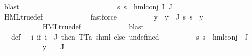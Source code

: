 \begin{isabellebody}
\ blast\isanewline
\ \ \ \ \ \ \isamarkupfalse%
\isanewline
\ \ \ \ \ \ \ \ \isamarkupfalse%
\ {}\isanewline
\ \ \ \ \ \ \ \ \isamarkupfalse%
\ {\isachardoublequoteopen}{\isasymforall}s{\isachardot}{\kern0pt}\ {\isasymnot}s\ {\isasymTurnstile}\ {\isacharparenleft}{\kern0pt}hml{\isacharunderscore}{\kern0pt}conj\ I\ J\ {\isasymPhi}{\isacharparenright}{\kern0pt}{\isachardoublequoteclose}\ \isanewline
\ \ \ \ \ \ \ \ \ \ \isamarkupfalse%
\ HML{\isacharunderscore}{\kern0pt}true{\isacharunderscore}{\kern0pt}def\ \isanewline
\ \ \ \ \ \ \ \ \ \ \isamarkupfalse%
\ fastforce\isanewline
\ \ \ \ \ \ \ \ \isamarkupfalse%
\ y\ \ {\isachardoublequoteopen}y\ {\isasymin}\ {\isasymPhi}{\isacharbackquote}{\kern0pt}J{\isachardoublequoteclose}\ {\isachardoublequoteopen}{\isacharparenleft}{\kern0pt}{\isasymforall}s{\isachardot}{\kern0pt}\ s\ {\isasymTurnstile}\ y{\isacharparenright}{\kern0pt}{\isachardoublequoteclose}\ \isanewline
\ \ \ \ \ \ \ \ \ \ \isamarkupfalse%
\ {\isachardoublequoteopen}{}{\isachardoublequoteclose}\isanewline
\ \ \ \ \ \ \ \ \ \ \isamarkupfalse%
\ HML{\isacharunderscore}{\kern0pt}true{\isacharunderscore}{\kern0pt}def\ \isanewline
\ \ \ \ \ \ \ \ \ \ \isamarkupfalse%
\ blast\isanewline
\ \ \ \ \ \ \ \ \isamarkupfalse%
\ {\isasymPsi}\ \ {\isasymPsi}{\isacharunderscore}{\kern0pt}def{\isacharcolon}{\kern0pt}\ {\isachardoublequoteopen}{\isasymPsi}\ {\isacharequal}{\kern0pt}\ {\isacharparenleft}{\kern0pt}{\isasymlambda}i{\isachardot}{\kern0pt}\ {\isacharparenleft}{\kern0pt}if\ i\ {\isasymin}\ J\ then\ {\isacharparenleft}{\kern0pt}TT{\isacharcolon}{\kern0pt}{\isacharcolon}{\kern0pt}{\isacharparenleft}{\kern0pt}{\isacharprime}{\kern0pt}a{\isacharcomma}{\kern0pt}\ {\isacharprime}{\kern0pt}s{\isacharparenright}{\kern0pt}hml{\isacharparenright}{\kern0pt}\ else\ undefined{\isacharparenright}{\kern0pt}{\isacharparenright}{\kern0pt}{\isachardoublequoteclose}\isanewline
\ \ \ \ \ \ \ \ \isamarkupfalse%
\ {\isachardoublequoteopen}{\isasymforall}s{\isachardot}{\kern0pt}\ {\isasymnot}s\ {\isasymTurnstile}\ {\isacharparenleft}{\kern0pt}hml{\isacharunderscore}{\kern0pt}conj\ {\isacharbraceleft}{\kern0pt}{\isacharbraceright}{\kern0pt}\ J\ {\isasymPsi}{\isacharparenright}{\kern0pt}{\isachardoublequoteclose}\ \isanewline
\ \ \ \ \ \ \ \ \ \ \isamarkupfalse%
\ {\isacartoucheopen}y\ {\isasymin}\ {\isasymPhi}\ {\isacharbackquote}{\kern0pt}\ J{\isacartoucheclose}\ \isamarkupfalse%

\end{isabellebody}
